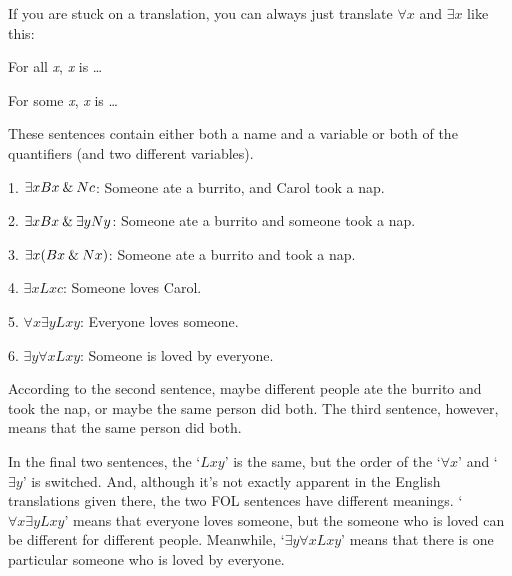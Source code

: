 If you are stuck on a translation, you can always just translate $\forall x$ and $\exists x$ like this:
\begin{ebullet}
\item[] For all \textit{x}, \textit{x} is \ldots
\item[] For some \textit{x}, \textit{x} is \ldots
\end{ebullet}



These sentences contain either both a name and a variable or both of the quantifiers (and two different variables).
\begin{ebullet}
	\item[1.]$\exists xBx \mathbin{\&} Nc$: Someone ate a burrito, and Carol took a nap.\smallskip
	\item[2.]$\exists xBx \mathbin{\&} \exists yNy$: Someone ate a burrito and someone took a nap.\smallskip
	\item[3.]$\exists x(Bx \mathbin{\&} Nx)$: Someone ate a burrito and took a nap.\smallskip
	\item[4.]$\exists xLxc$: Someone loves Carol.\smallskip
	\item[5.]$\forall x \exists yLxy$: Everyone loves someone.\smallskip
	\item[6.]$\exists y \forall xLxy$: Someone is loved by everyone.
\end{ebullet}
According to the second sentence, maybe different people ate the burrito and took the nap, or maybe the same person did both. The third sentence, however, means that the same person did both.

\label{quantifier-order} In the final two sentences, the `$Lxy$' is the same, but the order of the `$\forall x$' and `$\exists y$' is switched. And, although it's not exactly apparent in the English translations given there, the two FOL sentences have different meanings. `$\forall x \exists yLxy$' means that everyone loves someone, but the someone who is loved can be different for different people. Meanwhile, `$\exists y \forall xLxy$' means that there is one particular someone who is loved by everyone.

